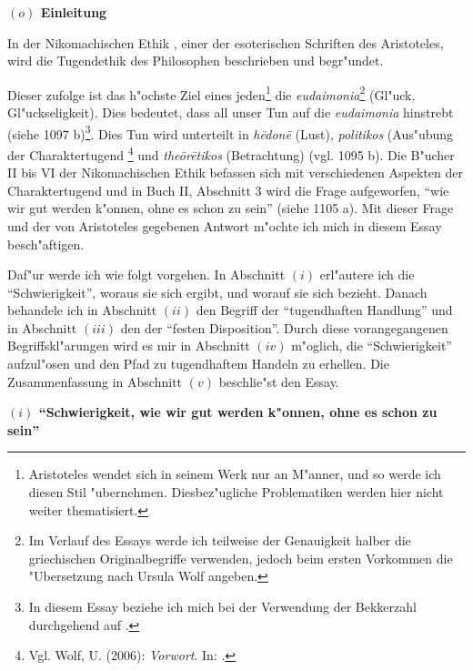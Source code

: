 \documentclass[a4paper, emulatestandardclasses, 12pt]{scrartcl}
\begin{document}
\begin{onehalfspace} 



\noindent\textbf{$(o)$ Einleitung}

\noindent In der Nikomachischen Ethik \citep{wolf2006nikomachische}, einer der esoterischen Schriften des Aristoteles, wird die Tugendethik des Philosophen beschrieben und begr"undet.

Dieser zufolge ist das h"ochste Ziel eines jeden\footnote{Aristoteles wendet sich in seinem Werk nur an M"anner, und so werde ich diesen Stil "ubernehmen. Diesbez"ugliche Problematiken werden hier nicht weiter thematisiert.} die \emph{eudaimonia}\footnote{Im Verlauf des Essays werde ich teilweise der Genauigkeit halber die griechischen Originalbegriffe verwenden, jedoch beim ersten Vorkommen die "Ubersetzung nach Ursula Wolf angeben.} (Gl"uck, Gl"uckseligkeit). Dies bedeutet, dass all unser Tun auf die \emph{eudaimonia} hinstrebt (siehe 1097 b)\footnote{In diesem Essay beziehe ich mich bei der Verwendung der Bekkerzahl durchgehend auf \citep{wolf2006nikomachische}.}. Dies Tun wird unterteilt in \emph{h\={e}don\={e}} (Lust), \emph{politikos} (Aus"ubung der Charaktertugend \footnote{Vgl. Wolf, U. (2006): \emph{Vorwort}. In: \citep{wolf2006nikomachische}.} %
 und \emph{the\={o}r\={e}tikos} (Betrachtung) (vgl. 1095 b). Die B"ucher II bis VI der Nikomachischen Ethik befassen sich mit verschiedenen Aspekten der Charaktertugend und in Buch II, Abschnitt 3 wird die Frage aufgeworfen, "`wie wir gut werden k"onnen, ohne es schon zu sein"' (siehe 1105 a). Mit dieser Frage und der von Aristoteles gegebenen Antwort m"ochte ich mich in diesem Essay besch"aftigen.\newline

Daf"ur werde ich wie folgt vorgehen. In Abschnitt $(i)$ erl"autere ich die "`Schwierigkeit"', woraus sie sich ergibt, und worauf sie sich bezieht. Danach behandele ich in Abschnitt $(ii)$ den Begriff der "`tugendhaften Handlung"' und in Abschnitt $(iii)$ den der "`festen Disposition"'. Durch diese vorangegangenen Begriffskl"arungen wird es mir in Abschnitt $(iv)$ m"oglich, die "`Schwierigkeit"' aufzul"osen und den Pfad zu tugendhaftem Handeln zu erhellen. Die Zusammenfassung in Abschnitt $(v)$ beschlie"st den Essay.

\vspace{5mm}

\noindent\textbf{$(i)$ "`Schwierigkeit, wie wir gut werden k"onnen, ohne es schon zu sein"'}


\end{onehalfspace}
\end{document}
